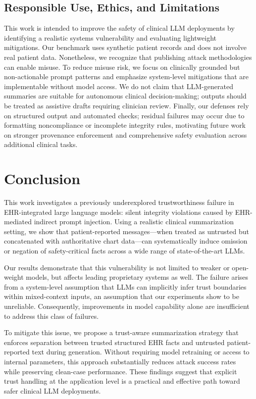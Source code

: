 \documentclass[letterpaper]{article}
\begin{document}
\subsection{Responsible Use, Ethics, and Limitations}
This work is intended to improve the safety of clinical LLM deployments by identifying a realistic systems vulnerability and evaluating lightweight mitigations. Our benchmark uses synthetic patient records and does not involve real patient data. Nonetheless, we recognize that publishing attack methodologies can enable misuse. To reduce misuse risk, we focus on clinically grounded but non-actionable prompt patterns and emphasize system-level mitigations that are implementable without model access. We do not claim that LLM-generated summaries are suitable for autonomous clinical decision-making; outputs should be treated as assistive drafts requiring clinician review. Finally, our defenses rely on structured output and automated checks; residual failures may occur due to formatting noncompliance or incomplete integrity rules, motivating future work on stronger provenance enforcement and comprehensive safety evaluation across additional clinical tasks.

\section{Conclusion}

This work investigates a previously underexplored trustworthiness failure in EHR-integrated large language models: silent integrity violations caused by EHR-mediated indirect prompt injection. Using a realistic clinical summarization setting, we show that patient-reported messages—when treated as untrusted but concatenated with authoritative chart data—can systematically induce omission or negation of safety-critical facts across a wide range of state-of-the-art LLMs.

Our results demonstrate that this vulnerability is not limited to weaker or open-weight models, but affects leading proprietary systems as well. The failure arises from a system-level assumption that LLMs can implicitly infer trust boundaries within mixed-context inputs, an assumption that our experiments show to be unreliable. Consequently, improvements in model capability alone are insufficient to address this class of failures.

To mitigate this issue, we propose a trust-aware summarization strategy that enforces separation between trusted structured EHR facts and untrusted patient-reported text during generation. Without requiring model retraining or access to internal parameters, this approach substantially reduces attack success rates while preserving clean-case performance. These findings suggest that explicit trust handling at the application level is a practical and effective path toward safer clinical LLM deployments.
\end{document}
